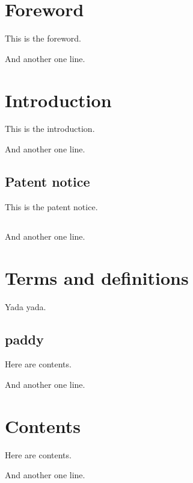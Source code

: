 \documentclass{IsoStandardDocument}
\begin{document}
  \section*{Foreword}

  This is the foreword.

  And another one line.

  \section*{Introduction}

  This is the introduction.

  And another one line.

  \subsection*{Patent notice}

  This is the patent notice.

  \subsection*{}

  And another one line.

  \section{Terms and definitions}

  Yada yada.

  \subsection{paddy}

  Here are contents.

  And another one line.

  \section{Contents}

  Here are contents.

  And another one line.
\end{document}
